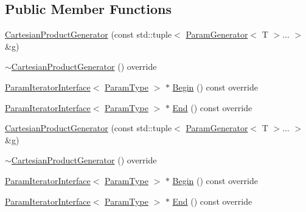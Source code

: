 \subsection*{Public Member Functions}
\begin{DoxyCompactItemize}
\item 
\mbox{\hyperlink{classtesting_1_1internal_1_1_cartesian_product_generator_af89630ce27d49f999f323e6c3d2867af}{Cartesian\+Product\+Generator}} (const std\+::tuple$<$ \mbox{\hyperlink{classtesting_1_1internal_1_1_param_generator}{Param\+Generator}}$<$ T $>$... $>$ \&g)
\item 
\mbox{\hyperlink{classtesting_1_1internal_1_1_cartesian_product_generator_a19fb6a9435f038520cef7643fdf6da71}{$\sim$\+Cartesian\+Product\+Generator}} () override
\item 
\mbox{\hyperlink{classtesting_1_1internal_1_1_param_iterator_interface}{Param\+Iterator\+Interface}}$<$ \mbox{\hyperlink{classtesting_1_1internal_1_1_cartesian_product_generator_af27131157a9347f0c82420ca081ee7dd}{Param\+Type}} $>$ $\ast$ \mbox{\hyperlink{classtesting_1_1internal_1_1_cartesian_product_generator_ad2f1bc6289b6dd7e4b5f4fecbfdf2883}{Begin}} () const override
\item 
\mbox{\hyperlink{classtesting_1_1internal_1_1_param_iterator_interface}{Param\+Iterator\+Interface}}$<$ \mbox{\hyperlink{classtesting_1_1internal_1_1_cartesian_product_generator_af27131157a9347f0c82420ca081ee7dd}{Param\+Type}} $>$ $\ast$ \mbox{\hyperlink{classtesting_1_1internal_1_1_cartesian_product_generator_ae072dcf8400ac9dd5692e417262a664b}{End}} () const override
\item 
\mbox{\hyperlink{classtesting_1_1internal_1_1_cartesian_product_generator_af89630ce27d49f999f323e6c3d2867af}{Cartesian\+Product\+Generator}} (const std\+::tuple$<$ \mbox{\hyperlink{classtesting_1_1internal_1_1_param_generator}{Param\+Generator}}$<$ T $>$... $>$ \&g)
\item 
\mbox{\hyperlink{classtesting_1_1internal_1_1_cartesian_product_generator_a19fb6a9435f038520cef7643fdf6da71}{$\sim$\+Cartesian\+Product\+Generator}} () override
\item 
\mbox{\hyperlink{classtesting_1_1internal_1_1_param_iterator_interface}{Param\+Iterator\+Interface}}$<$ \mbox{\hyperlink{classtesting_1_1internal_1_1_cartesian_product_generator_af27131157a9347f0c82420ca081ee7dd}{Param\+Type}} $>$ $\ast$ \mbox{\hyperlink{classtesting_1_1internal_1_1_cartesian_product_generator_ad2f1bc6289b6dd7e4b5f4fecbfdf2883}{Begin}} () const override
\item 
\mbox{\hyperlink{classtesting_1_1internal_1_1_param_iterator_interface}{Param\+Iterator\+Interface}}$<$ \mbox{\hyperlink{classtesting_1_1internal_1_1_cartesian_product_generator_af27131157a9347f0c82420ca081ee7dd}{Param\+Type}} $>$ $\ast$ \mbox{\hyperlink{classtesting_1_1internal_1_1_cartesian_product_generator_ae072dcf8400ac9dd5692e417262a664b}{End}} () const override
\end{DoxyCompactItemize}
